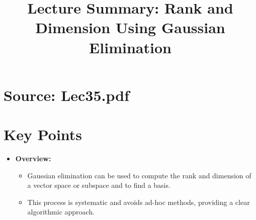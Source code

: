 \documentclass{article}
\title{Lecture Summary: Rank and Dimension Using Gaussian Elimination}
\author{}
\date{}
\begin{document}
\maketitle

\section*{Source: Lec35.pdf}

\section*{Key Points}

\begin{itemize}
  \item \textbf{Overview:}
    \begin{itemize}
      \item Gaussian elimination can be used to compute the rank and dimension of a vector space or subspace and to find a basis.
      \item This process is systematic and avoids ad-hoc methods, providing a clear algorithmic approach.
    \end{itemize}


\end{itemize}
\end{document}
